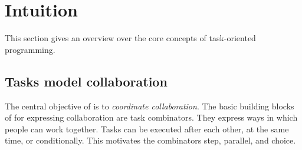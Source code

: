 


\section{Intuition}
\label{sec:intuition}

This section gives an overview over the core concepts of task-oriented programming.



\subsection{Tasks model collaboration}

The central objective of \TOP is to \emph{coordinate collaboration}.
The basic building blocks of \TOPHAT for expressing collaboration are task combinators.
They express ways in which people can work together.
Tasks can be executed after each other, at the same time, or conditionally.
This motivates the combinators step, parallel, and choice.

